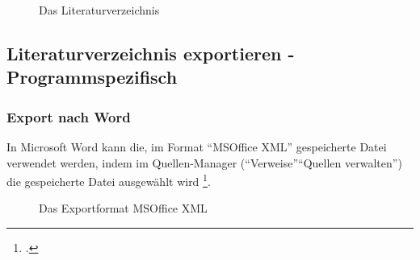 		
\begin{figure}[h!]
 \centering
 \caption{Das Literaturverzeichnis}
 \label{fig:literaturverzeichnis}
\end{figure}


\subsection{Literaturverzeichnis exportieren - Programmspezifisch}
\label{subsec:lvExportProgramme}
\subsubsection*{Export nach Word}  \label{sss:exportWord}
In Microsoft Word kann die, im Format \enquote{MSOffice XML}  gespeicherte Datei verwendet werden, indem im Quellen-Manager (\enquote{Verweise}\enquote{Quellen verwalten}) die gespeicherte Datei ausgewählt wird \footcite{Genaue Anleitung im Blogbeitrag:https://blog.ub.uni-stuttgart.de/category/puma/}{}.
\begin{figure}[h!]
 \centering
 \caption{Das Exportformat MSOffice XML}
 \label{fig:exportformatMSOfficeXml}
\end{figure}

